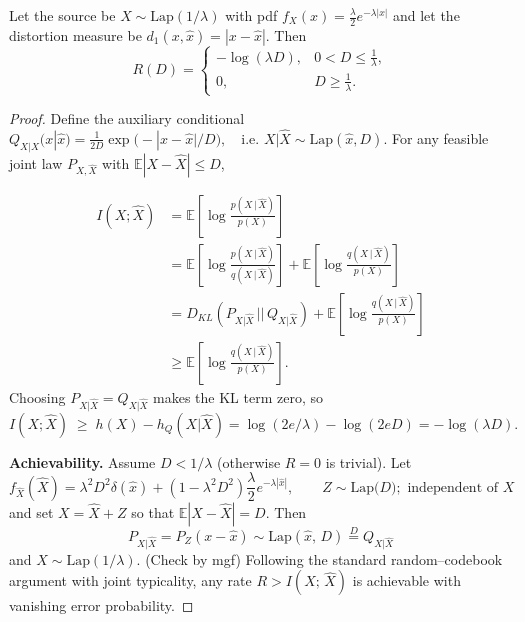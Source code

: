 \medskip
\begin{example}

Let the source be
\(X\sim\mathrm{Lap}(1/\lambda)\) with pdf
\(f_X(x)=\tfrac{\lambda}{2}e^{-\lambda|x|}\)
and let the distortion measure be
\(d_1(x,\widehat x)=|x-\widehat x|\).
Then
\[
R(D)=
\begin{cases}
       -\log(\lambda D),
         & 0<D\le\frac1{\lambda},\\[6pt]
0,      & D\ge\frac1{\lambda}.
\end{cases}
\]

\begin{proof}
Define the auxiliary conditional
\(Q_{X|\widehat X}(x|\widehat x)
      =\frac1{2D}\exp\!\bigl(-|x-\widehat x|/D\bigr),
      \quad\text{i.e.\ }X|\widehat X\sim\mathrm{Lap}(\widehat x,D).\) For any feasible joint law \(P_{X,\widehat X}\) with
\(\mathbb E|X-\widehat X|\le D\),

\[
\begin{aligned}
    I(X;\widehat X)&=\mathbb{E}\left[\log\frac{p(X\,|\,\widehat X)}{p(X)}\right]\\&=\mathbb{E}\left[\log\frac{p(X\,|\,\widehat X)}{q(X\,|\,\widehat X)}\right]+\mathbb{E}\left[\log\frac{q(X\,|\,\widehat X)}{p(X)}\right]\\&=D_{KL}(P_{X|\widehat X}\,||\,Q_{X|\widehat X})+\mathbb{E}\left[\log\frac{q(X\,|\,\widehat X)}{p(X)}\right]\\&\geq\mathbb{E}\left[\log\frac{q(X\,|\,\widehat X)}{p(X)}\right].
\end{aligned}
\]
Choosing \(P_{X|\widehat X}=Q_{X|\widehat X}\) makes the KL term zero, so
\[
I(X;\widehat X)\;\ge\;
h(X)-h_Q(X|\widehat X)
      =\log(2e/\lambda)-\log(2eD)=-\log(\lambda D).
\]

\noindent\textbf{Achievability.}
Assume \(D<1/\lambda\) (otherwise \(R=0\) is trivial).
Let
\[f_{\widehat X}({\widehat X})=\lambda^2D^2\delta(\widehat x)+(1-\lambda^2D^2)\frac{\lambda}{2}e^{-\lambda|\widehat x|},\qquad Z\sim\mathrm{Lap}\bigl(D\bigr);\text{ independent of } X\]
and set \(X=\widehat X+Z\) so that $\mathbb{E}|X-\widehat X|=D$.
Then
\[P_{X|\widehat X}=P_Z(x-\widehat x)\sim \mathrm{Lap}(\widehat x,\,D)\overset{D}{=}Q_{X|\widehat{X}}\]
and $X\sim\mathrm{Lap}(1/\lambda).$ (Check by mgf)
Following the standard random–codebook
argument with joint typicality, any rate $R>I(X;\,\widehat X)$ is achievable with vanishing error probability.
\end{proof}
\end{example}


